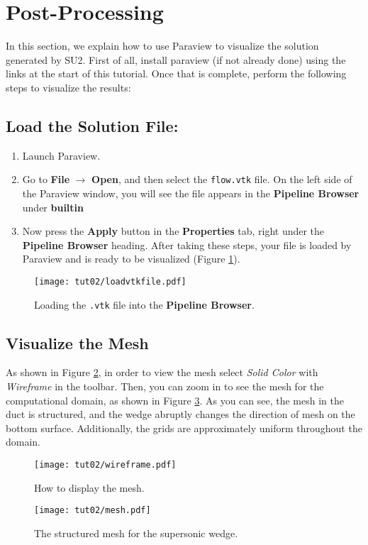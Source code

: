 \section{Post-Processing}
In this section, we explain how to use Paraview to visualize the solution generated by SU2. First of all, install paraview (if not already done) using the links at the start of this tutorial. Once that is complete, perform the following steps to visualize the results:
\subsection{Load the Solution File:}
\begin{enumerate}[label=\arabic*)]
	\item Launch Paraview.
	\item Go to \textbf{File} $\rightarrow$ \textbf{Open}, and then select the \texttt{flow.vtk} file. On the left side of the Paraview window, you will see the file appears in the \textbf{Pipeline Browser} under \textbf{builtin}
	\item Now press the \textbf{Apply} button in the \textbf{Properties} tab, right under the \textbf{Pipeline Browser} heading. After taking these steps, your file is loaded by Paraview and is ready to be visualized (Figure \ref{fig2:load}).
\end{enumerate}
\begin{figure}[ht]
    \centering
    \texttt{[image: tut02/loadvtkfile.pdf]}
    \caption{Loading the \texttt{.vtk} file into the \textbf{Pipeline Browser}.}
    \label{fig2:load}
\end{figure}
\subsection{Visualize the Mesh}
As shown in Figure \ref{fig2:wireframe}, in order to view the mesh select \textit{Solid Color} with \textit{Wireframe} in the toolbar. Then, you can zoom in to see the mesh for the computational domain, as shown in Figure \ref{fig2:mesh}. As you can see, the mesh in the duct is structured, and the wedge abruptly changes the direction of mesh on the bottom surface. Additionally, the grids are approximately uniform throughout the domain.
\begin{figure}[ht]
    \centering
    \texttt{[image: tut02/wireframe.pdf]}
    \caption{How to display the mesh.}
    \label{fig2:wireframe}
\end{figure}
\begin{figure}[ht]
    \centering
    \texttt{[image: tut02/mesh.pdf]}
    \caption{The structured mesh for the supersonic wedge.}
    \label{fig2:mesh}
\end{figure}
